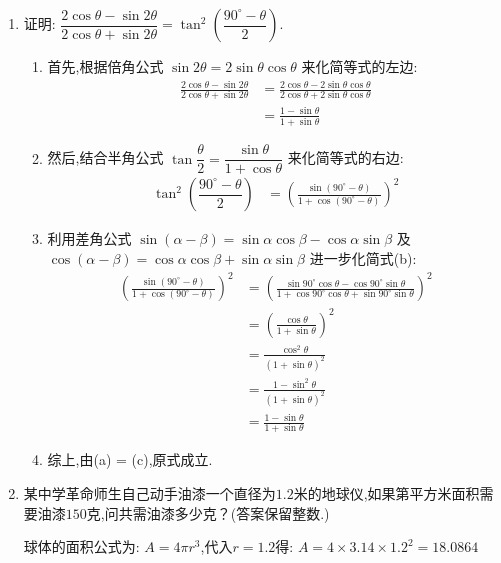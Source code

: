 \begin{questions}
\begin{enumerate}[label=(\arabic*)]
		\item 证明: \( \dfrac{2\cos\theta - \sin2\theta}{2\cos\theta + \sin2\theta} = \tan^2\left(\dfrac{90^\circ -
			      \theta}{2}\right) \).
		      \begin{solution}
			      \begin{enumerate}[label=\arabic*. ]
				      \item 首先,根据倍角公式 \( \sin2\theta = 2\sin\theta\cos\theta \) 来化简等式的左边:
				            \begin{align*}
					            \frac{2\cos\theta - \sin2\theta}{2\cos\theta + \sin2\theta}
					             & = \frac{2\cos\theta - 2\sin\theta\cos\theta}{2\cos\theta + 2\sin\theta\cos\theta} \\
					             & = \frac{1-\sin\theta}{1+\sin\theta} \tag{a}
				            \end{align*}
				      \item 然后,结合半角公式 \( \tan\dfrac{\theta}{2} = \dfrac{\sin\theta}{1+\cos\theta} \)
				            来化简等式的右边:
				            \begin{align*}
					            \tan^2\left(\dfrac{90^\circ - \theta}{2}\right)
					             & = \left(\frac{\sin(90^\circ-\theta)}{1+\cos(90^\circ-\theta)}\right)^2 \tag{b}
				            \end{align*}
				      \item 利用差角公式 \( \sin(\alpha-\beta) = \sin\alpha\cos\beta - \cos\alpha\sin\beta \) 及 \(
				            \cos(\alpha - \beta) = \cos\alpha\cos\beta + \sin\alpha\sin\beta \) 进一步化简式(b):
				            \begin{align*}
					            \left(\frac{\sin(90^\circ-\theta)}{1+\cos(90^\circ-\theta)}\right)^2
					             & = \left(\frac{\sin90^\circ\cos\theta -
						            \cos90^\circ\sin\theta}{1+\cos90^\circ\cos\theta + \sin90^\circ\sin\theta}\right)^2
					            \\
					             & = \left(\frac{\cos\theta}{1+\sin\theta}\right)^2 \\
					             & = \frac{\cos^2\theta}{(1+\sin\theta)^2}          \\
					             & = \frac{1-\sin^2\theta}{(1+\sin\theta)^2}        \\
					             & = \frac{1-\sin\theta}{1+\sin\theta} \tag{c}
				            \end{align*}
				      \item 综上,由(a) = (c),原式成立.
			      \end{enumerate}
		      \end{solution}
		\item
		      某中学革命师生自己动手油漆一个直径为$1.2$米的地球仪,如果第平方米面积需要油漆$150$克,问共需油漆多少克？(答案保留整数.)
		      \begin{solution}
			      球体的面积公式为: \( A = 4\pi r^3 \),代入$r=1.2$得:
			      \begin{math}
				      A = 4\times 3.14 \times 1.2^2 = 18.0864
			      \end{math}


\end{solution}
\end{enumerate}
\end{questions}
